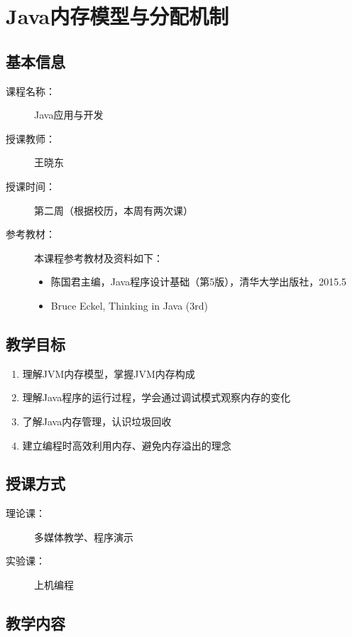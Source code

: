 \chapter{Java内存模型与分配机制}
\label{chp:Java-memory-allocation}

\section*{基本信息}
\sline
\begin{description}
\item[课程名称：] Java应用与开发
\item[授课教师：] 王晓东
\item[授课时间：] 第二周（根据校历，本周有两次课）
\item[参考教材：] 本课程参考教材及资料如下：
  \begin{itemize}
  \item 陈国君主编，Java程序设计基础（第5版），清华大学出版社，2015.5
  \item Bruce Eckel, Thinking in Java (3rd)
  \end{itemize}
\end{description}

\section*{教学目标}

\sline

\begin{enumerate}
\item 理解JVM内存模型，掌握JVM内存构成
\item 理解Java程序的运行过程，学会通过调试模式观察内存的变化
\item 了解Java内存管理，认识垃圾回收
\item 建立编程时高效利用内存、避免内存溢出的理念
\end{enumerate}  

\section*{授课方式}

\sline
\begin{description}
\item[理论课：] 多媒体教学、程序演示
\item[实验课：] 上机编程
\end{description}

\newpage
\section*{教学内容}
\sline

